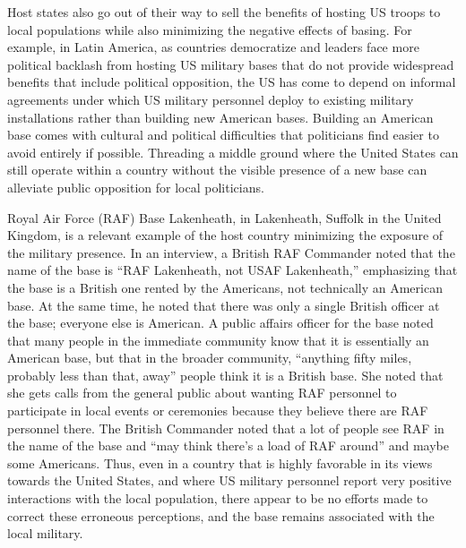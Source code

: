 Host states also go out of their way to sell the benefits of hosting US troops to local populations while also minimizing the negative effects of basing. For example, in Latin America, as countries democratize and leaders face more political backlash from hosting US military bases that do not provide widespread benefits that include political opposition, the US has come to depend on informal agreements under which US military personnel deploy to existing military installations rather than building new American bases.\autocite{Bitar2016} Building an American base comes with cultural and political difficulties that politicians find easier to avoid entirely if possible. Threading a middle ground where the United States can still operate within a country without the visible presence of a new base can alleviate public opposition for local politicians. 

Royal Air Force (RAF) Base Lakenheath, in Lakenheath, Suffolk in the United Kingdom, is a relevant example of the host country minimizing the exposure of the military presence.  In an interview, a British RAF Commander noted that the name of the base is ``RAF Lakenheath, not USAF Lakenheath,'' emphasizing that the base is a British one rented by the Americans, not technically an American base.  At the same time, he noted that there was only a single British officer at the base; everyone else is American.\autocite{rafthree20190719} A public affairs officer for the base noted that many people in the immediate community know that it is essentially an American base, but that in the broader community, ``anything fifty miles, probably less than that, away'' people think it is a British base.  She noted that she gets calls from the general public about wanting RAF personnel to participate in local events or ceremonies because they believe there are RAF personnel there.\autocite{raftwo20190719} The British Commander noted that a lot of people see RAF in the name of the base and ``may think there's a load of RAF around'' and maybe some Americans.\autocite{rafthree20190719} Thus, even in a country that is highly favorable in its views towards the United States, and where US military personnel report very positive interactions with the local population, there appear to be no efforts made to correct these erroneous perceptions, and the base remains associated with the local military.

